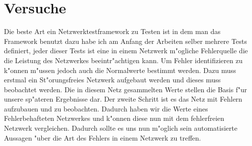 \chapter{Versuche}
\label{cha:versuche}
Die beste Art ein Netzwerktestframework zu Testen ist in dem man das Framework benutzt %
dazu habe ich am Anfang der Arbeiten selber mehrere Tests definiert, jeder dieser Tests %
ist eine in einem Netzwerk m"ogliche Fehlerquelle die die Leistung des Netzwerkes %
beeintr"achtigen kann. Um Fehler identifizieren %
zu k"onnen m"ussen jedoch auch die Normalwerte bestimmt werden. Dazu muss erstmal ein %
St"orungsfreies Netzwerk aufgebaut werden und dieses muss beobachtet werden. %
Die in diesem Netz gesammelten Werte stellen die Basis f"ur unsere sp"ateren Ergebnisse dar. %
Der zweite Schritt ist es das Netz mit Fehlern aufzubauen und zu beobachten. Dadurch %
haben wir die Werte eines Fehlerbehafteten Netzwerkes und k"onnen diese nun mit dem %
fehlerfreien Netzwerk vergleichen. Dadurch sollte es uns nun m"oglich sein automatisierte %
Aussagen "uber die Art des Fehlers in einem Netzwerk zu treffen. %

